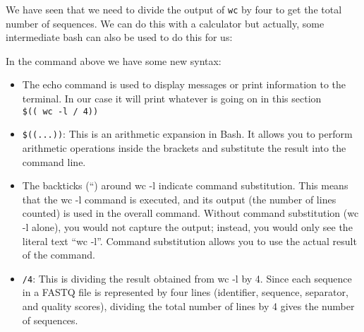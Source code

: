 \documentclass[
  letterpaper,
  DIV=11,
  numbers=noendperiod]{scrreprt}
\newenvironment{Shaded}{}{}
\newcommand{\AttributeTok}[1]{\textcolor[rgb]{0.84,0.23,0.29}{#1}}
\newcommand{\BuiltInTok}[1]{\textcolor[rgb]{0.84,0.23,0.29}{#1}}
\newcommand{\DecValTok}[1]{\textcolor[rgb]{0.00,0.36,0.77}{#1}}
\newcommand{\FunctionTok}[1]{\textcolor[rgb]{0.44,0.26,0.76}{#1}}
\newcommand{\KeywordTok}[1]{\textcolor[rgb]{0.84,0.23,0.29}{#1}}
\newcommand{\NormalTok}[1]{\textcolor[rgb]{0.14,0.16,0.18}{#1}}
\newcommand{\OperatorTok}[1]{\textcolor[rgb]{0.14,0.16,0.18}{#1}}
\newcommand{\VariableTok}[1]{\textcolor[rgb]{0.89,0.38,0.04}{#1}}
\providecommand{\tightlist}{%
  \setlength{\itemsep}{0pt}\setlength{\parskip}{0pt}}\usepackage{longtable,booktabs,array}
\begin{document}
\begin{tcolorbox}[enhanced jigsaw, rightrule=.15mm, colbacktitle=quarto-callout-tip-color!10!white, colframe=quarto-callout-tip-color-frame, colback=white, arc=.35mm, opacitybacktitle=0.6, coltitle=black, bottomtitle=1mm, breakable, bottomrule=.15mm, leftrule=.75mm, titlerule=0mm, title=\textcolor{quarto-callout-tip-color}{\faLightbulb}\hspace{0.5em}{Avanced Tip: better counting}, toprule=.15mm, toptitle=1mm, opacityback=0, left=2mm]

We have seen that we need to divide the output of \texttt{wc} by four to
get the total number of sequences. We can do this with a calculator but
actually, some intermediate bash can also be used to do this for us:

\begin{Shaded}
\end{Shaded}

In the command above we have some new syntax:

\begin{itemize}
\tightlist
\item
  The echo command is used to display messages or print information to
  the terminal. In our case it will print whatever is going on in this
  section
  \texttt{\$((\ \textasciigrave{}wc\ -l\textasciigrave{}\ /\ 4))}
\item
  \texttt{\$((...))}: This is an arithmetic expansion in Bash. It allows
  you to perform arithmetic operations inside the brackets and
  substitute the result into the command line.
\item
  The backticks (``) around wc -l indicate command substitution. This
  means that the wc -l command is executed, and its output (the number
  of lines counted) is used in the overall command. Without command
  substitution (wc -l alone), you would not capture the output; instead,
  you would only see the literal text ``wc -l''. Command substitution
  allows you to use the actual result of the command.
\item
  \texttt{/4}: This is dividing the result obtained from wc -l by 4.
  Since each sequence in a FASTQ file is represented by four lines
  (identifier, sequence, separator, and quality scores), dividing the
  total number of lines by 4 gives the number of sequences.
\end{itemize}

\end{tcolorbox}
\end{document}
